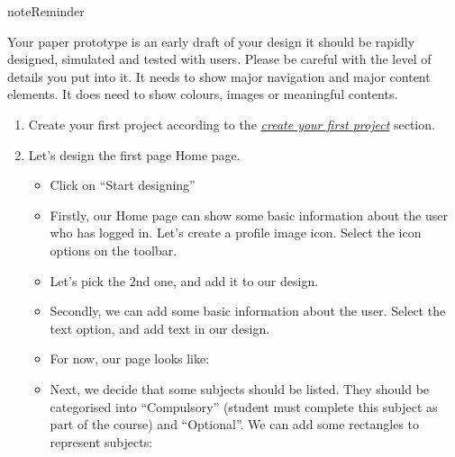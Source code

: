 \documentclass[letterpaper,10pt,english]{jupyterBook}
\begin{document}
\begin{sphinxadmonition}{note}{Reminder}

\sphinxAtStartPar
Your paper prototype is an early draft of your design \sphinxhyphen{} it should be rapidly designed, simulated and tested with
users. Please be careful with the level of details you put into it.  It needs to show major navigation and major
content elements. It does  need to show colours, images or meaningful contents.
\end{sphinxadmonition}
\begin{enumerate}
%
\item {} 
\sphinxAtStartPar
Create your first project according to the {\hyperref[\detokenize{appendices/appendix_e/marvel_guide:create-your-first-project}]{\emph{create your first project}}} section.

\item {} 
\sphinxAtStartPar
Let’s design the first page \sphinxhyphen{} Home page.
\begin{itemize}
\item {} 
\sphinxAtStartPar
Click on “Start designing” 

\item {} 
\sphinxAtStartPar
Firstly, our Home page can show some basic information about the user who has logged in. Let’s create a profile
image icon. Select the icon options on the toolbar.

\item {} 
\sphinxAtStartPar
Let’s pick the 2nd one, and add it to our design.

\item {} 
\sphinxAtStartPar
Secondly, we can add some basic information about the user. Select the text option, and add text in our design.

\item {} 
\sphinxAtStartPar
For now, our page looks like:

\item {} 
\sphinxAtStartPar
Next, we decide that some subjects should be listed.  They should be categorised into “Compulsory” (student
must complete this subject as part of the course) and “Optional”. We can add some rectangles to represent subjects:


\end{itemize}
\end{enumerate}
\end{document}
